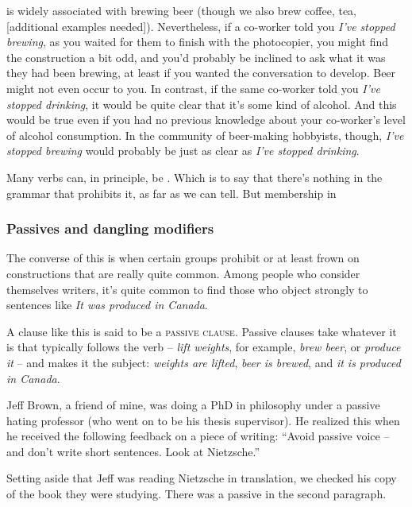              is widely associated with brewing beer (though we also brew coffee, tea, [additional examples needed]). Nevertheless, if a co-worker told you \textit{I've stopped brewing}, as you waited for them to finish with the photocopier, you might find the construction a bit odd, and you'd probably be inclined to ask what it was they had been brewing, at least if you wanted the conversation to develop. Beer might not even occur to you. In contrast, if the same co-worker told you \textit{I've stopped drinking}, it would be quite clear that it's some kind of alcohol. And this would be true even if you had no previous knowledge about your co-worker's level of alcohol consumption. In the community of beer-making hobbyists, though, \textit{I've stopped brewing} would probably be just as clear as \textit{I've stopped drinking}.
    
            Many verbs can, in principle, be . Which is to say that there's nothing in the grammar that prohibits it, as far as we can tell. But membership in %

        \subsubsection*{Passives and dangling modifiers}
    
            The converse of this is when certain groups prohibit or at least frown on constructions that are really quite common. Among people who consider themselves writers, it's quite common to find those who object strongly to sentences like \textit{It was produced in Canada}.
            
            A clause like this is said to be a \textsc{passive clause}. Passive clauses take whatever it is that typically follows the verb -- \textit{lift weights}, for example, \textit{brew beer}, or \textit{produce it} -- and makes it the subject: \textit{weights are lifted}, \textit{beer is brewed}, and \textit{it is produced in Canada}. 
            
            Jeff Brown, a friend of mine, was doing a PhD in philosophy under a passive hating professor (who went on to be his thesis supervisor). He realized this when he received the following feedback on a piece of writing: \enquote{Avoid passive voice -- and don't write short sentences. Look at Nietzsche.}

            Setting aside that Jeff was reading Nietzsche in translation, we checked his copy of the book they were studying. There was a passive in the second paragraph.

